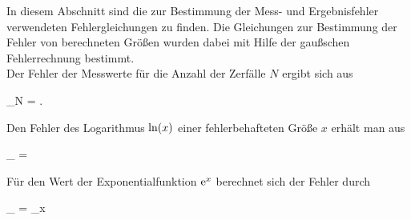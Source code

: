 In diesem Abschnitt sind die zur Bestimmung der Mess- und Ergebnisfehler verwendeten
Fehlergleichungen zu finden. Die Gleichungen zur Bestimmung der Fehler von berechneten
Größen wurden dabei mit Hilfe der gaußschen Fehlerrechnung bestimmt. \\

Der Fehler der Messwerte für die Anzahl der Zerfälle $N$ ergibt sich  aus
\begin{errorEquation}
	\sigma_{N} = .
\end{errorEquation}


Den Fehler des Logarithmus  $\Ln{x}$ einer fehlerbehafteten Größe $x$ erhält man aus
\begin{errorEquation}
	 \sigma_{\ln} =  
\end{errorEquation}


Für den Wert der Exponentialfunktion $\mathrm{e}^{x}$ berechnet sich der Fehler durch
\begin{errorEquation}
	 \sigma_{\exp} =  \cdot \sigma_{x} 
\end{errorEquation}
 